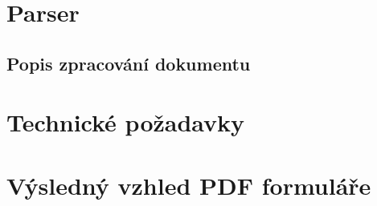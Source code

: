 \section{Parser}

\subsection{Popis zpracování dokumentu}

\section{Technické požadavky}
\section{Výsledný vzhled PDF formuláře}


